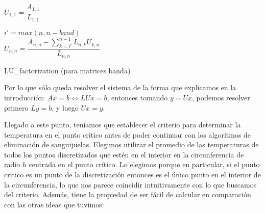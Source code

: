 \begin{algorithm}[H]
 \vspace{0.5cm}	
 	$U_{1,1} = \dfrac{A_{1,1}}{L_{1,1}} $ \\
 	\vspace{0.5cm}	
 	
	\vspace{0.5cm}	 	
	
	\vspace{0.5cm}
	
	$i' = max(n,n-band)$ \\
	$U_{n,n}= \dfrac{A_{n,n} - \sum\limits_{k=i'}^{n-1}L_{n,k}U_{k,n}}{L_{n,n}}$\\
	
   	\vspace{0.5cm}	
\caption{LU\_factorization (para matrices banda) \label{alg_LU_factorization}}  
\end{algorithm} 

Por lo que sólo queda resolver el sistema de la forma que explicamos en la introducción: $Ax = b \iff LUx = b$, entonces tomando $y = Ux$, podemos resolver primero $Ly = b$, y luego $Ux = y$.

Llegado a este punto, teníamos que establecer el criterio para determinar la temperatura en el punto crítico antes de poder continuar con los algorítmos de eliminación de sanguijuelas. Elegimos utilizar el promedio de las temperaturas de todos los puntos discretizados que estén en el interior en la circunferencia de radio $h$ centrada en el punto crítico. Lo elegimos porque en particular, si el punto critico es un punto de la discretizaci\'on entonces es el único punto en el interior de la circunferencia, lo que nos parece coincidir intuitivamente con lo que buscamos del criterio. Además, tiene la propiedad de ser fácil de calcular en comparación con las otras ideas que tuvimos:

